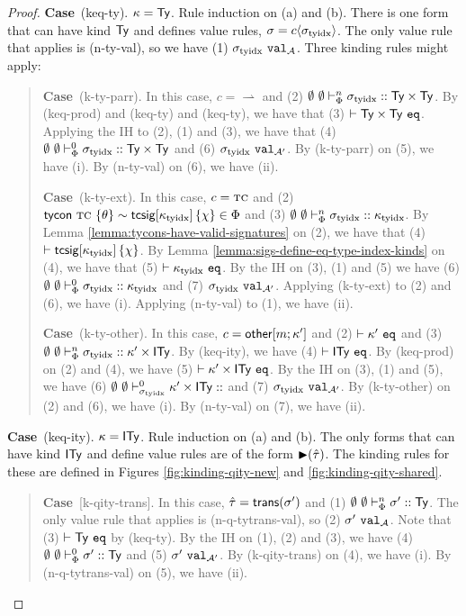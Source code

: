 \documentclass[12pt]{article}
\newcommand{\pfcase}[1]{\textbf{Case}~#1. }
\begin{document}
\begin{proof}
\pfcase{(keq-ty)} $\kappa={\sf Ty}$. Rule induction on (a) and (b). There is one form that can have kind ${\sf Ty}$ and defines value rules, $\sigma={c}\langle\sigma_\text{tyidx}\rangle$. The only value rule that applies is (n-ty-val), so we have (1) $\sigma_\text{tyidx}~\mathtt{val}_{\mathcal{A}}$. Three kinding rules might apply:
\begin{quote}
\pfcase{(k-ty-parr)} In this case, $c=\rightharpoonup$ and (2) $\emptyset~\emptyset \vdash_{\Phi}^{n} \sigma_\text{tyidx} :: {\sf Ty}\times{\sf Ty}$. By (keq-prod) and (keq-ty) and (keq-ty), we have that (3) $\vdash {\sf Ty}\times{\sf Ty}~\mathtt{eq}$. Applying the IH to (2), (1) and (3), we have that (4) $\emptyset~\emptyset \vdash_{\Phi}^{0} \sigma_\text{tyidx} :: {\sf Ty}\times{\sf Ty}$ and (6) $\sigma_\text{tyidx}~\mathtt{val}_{\mathcal{A}'}$. By (k-ty-parr) on (5), we have (i). By (n-ty-val) on (6), we have (ii).

\pfcase{(k-ty-ext)} In this case, $c=\textsc{tc}$ and (2) ${\sf tycon}~\textsc{tc} ~\{\theta\} \sim {\sf tcsig}[\kappa_\text{tyidx}]\,\{\chi\} \in\Phi$ and (3) $\emptyset~\emptyset \vdash_{\Phi}^{n} \sigma_\text{tyidx} :: \kappa_\text{tyidx}$. By Lemma \ref{lemma:tycons-have-valid-signatures} on (2), we have that (4) $\vdash {\sf tcsig}[\kappa_\text{tyidx}]\,\{\chi\}$. By Lemma \ref{lemma:sigs-define-eq-type-index-kinds} on (4), we have that (5) $\vdash \kappa_\text{tyidx}~\mathtt{eq}$. By the IH on (3), (1) and (5) we have (6) $\emptyset~\emptyset \vdash_{\Phi}^{0} \sigma_\text{tyidx} :: \kappa_\text{tyidx}$ and (7) $\sigma_\text{tyidx}~\mathtt{val}_{\mathcal{A}'}$. Applying (k-ty-ext) to (2) and (6), we have (i). Applying (n-ty-val) to (1), we have (ii). 

\pfcase{(k-ty-other)} In this case, $c={\sf other}[m;\kappa']$ and (2) $\vdash \kappa'~\mathtt{eq}$ and (3) $\emptyset~\emptyset \vdash_{\Phi}^{n} \sigma_\text{tyidx} :: \kappa'\times{\sf ITy}$. By (keq-ity), we have (4) $\vdash {\sf ITy}~\mathtt{eq}$. By (keq-prod) on (2) and (4), we have (5) $\vdash \kappa'\times{\sf ITy}~\mathtt{eq}$. By the IH on (3), (1) and (5), we have (6) $\sofkz{\emptyset}{\emptyset}{\sttyidx}{\kappa'\times\kity}$ and (7) $\sigma_\text{tyidx}~\mathtt{val}_{\mathcal{A}'}$. By (k-ty-other) on (2) and (6), we have (i). By (n-ty-val) on (7), we have (ii). 
\end{quote}

\pfcase{(keq-ity)} $\kappa={\sf ITy}$. Rule induction on (a) and (b). The only forms that can have kind ${\sf ITy}$ and define value rules are of the form ${\blacktriangleright}(\hat{\tau})$. The kinding rules for these are defined in Figures \ref{fig:kinding-qity-new} and \ref{fig:kinding-qity-shared}. 
\begin{quote}
\pfcase{[k-qity-trans]} In this case, $\hat{\tau}={\sf trans}(\sigma')$ and (1) $\emptyset~\emptyset \vdash_{\Phi}^{n} \sigma' :: {\sf Ty}$. The only value rule that applies is (n-q-tytrans-val), so (2) $\sigma'~\mathtt{val}_{\mathcal{A}}$. Note that (3) $\vdash {\sf Ty}~\mathtt{eq}$ by (keq-ty). By the IH on (1), (2) and (3), we have (4) $\emptyset~\emptyset \vdash_{\Phi}^{0} \sigma' :: {\sf Ty}$ and (5) $\sigma'~\mathtt{val}_{\mathcal{A}'}$. By (k-qity-trans) on (4), we have (i). By (n-q-tytrans-val) on (5), we have (ii).


\end{quote}
\end{proof}
\end{document}
